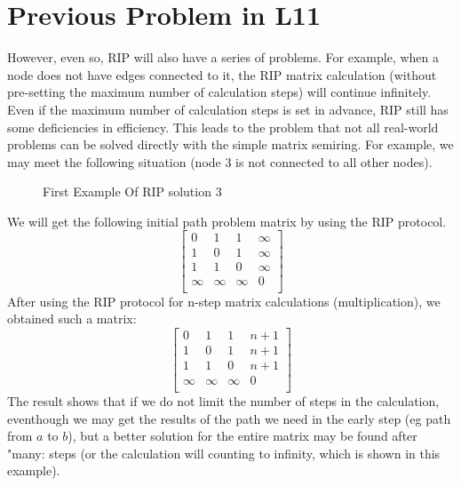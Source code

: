\documentclass[a4paper,12pt,twoside,openright]{report}
\begin{document}
\section{Previous Problem in L11}
However, even so, RIP will also have a series of problems. For example, when a node does not have edges connected to it, the RIP matrix calculation (without pre-setting the maximum number of calculation steps) will continue infinitely. Even if the maximum number of calculation steps is set in advance, RIP still has some deficiencies in efficiency. 
This leads to the problem that not all real-world problems can be solved directly with the simple matrix semiring. 
For example, we may meet the following situation (node 3 is not connected to all other nodes).
\begin{figure}[H]
\centering
{}
\label{example:rip:3}
\caption{First Example Of RIP solution 3}
\end{figure}
We will get the following initial path problem matrix by using the RIP protocol.
\[
\begin{bmatrix}
    0 & 1 & 1 & \infty \\
    1 & 0 & 1 & \infty \\
    1 & 1 & 0 & \infty \\
    \infty & \infty & \infty & 0 \\
\end{bmatrix}
\]
After using the RIP protocol for n-step matrix calculations (multiplication), we obtained such a matrix:
\[
\begin{bmatrix}
    0 & 1 & 1 & n+1 \\
    1 & 0 & 1 & n+1 \\
    1 & 1 & 0 & n+1 \\
    \infty & \infty & \infty & 0 \\
\end{bmatrix}
\]
The result shows that if we do not limit the number of steps in the calculation, eventhough we may get the results of the path we need in the early step (eg path from $a$ to $b$), but a better solution for the entire matrix may be found after "many: steps (or the calculation will counting to infinity, which is shown in this example).
\end{document}
